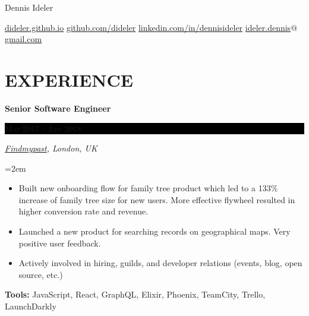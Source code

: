 \documentclass[paper=a4,fontsize=11pt]{scrartcl} %
\newlength{\spacebox}
\newcommand{\sepspace}{\vspace*{1em}}     %
\newcommand{\FullName}[1]{
    \Huge \usefont{OT1}{phv}{b}{n} \hfill #1
    \par \normalsize \normalfont}
\newcommand{\Slogan}[1]{
    \large \usefont{OT1}{phv}{m}{n}\hfill \textit{#1}
    \par \normalsize \normalfont}
\newcommand{\NewPart}[1]{\section*{\uppercase{#1}}}
\newcommand{\PersonalEntry}[2]{
    \noindent\hangindent=2em\hangafter=0  %
    \parbox{\spacebox}{                   %
    \textit{#1}}                          %
    \hspace{1.5em} #2 \par}               %
\newcommand{\EducationEntry}[4]{
    \noindent \textbf{#1} \hfill        %
    \colorbox{Black}{
      \parbox{8.5em}{
      \hfill\color{White}#2}} \par      %
    \noindent \textit{#3} \par          %
    \noindent\hangindent=2em\hangafter=0 \small #4 %
    \normalsize \par}
\newcommand{\WorkEntry}[4]{             %
    \noindent \textbf{#1} \hfill        %
    \colorbox{Black}{%
      \parbox{9em}{%
      \hfill\color{White}#2}} \par      %
        \noindent \textit{#3} \par      %
    \noindent\hangindent=2em\hangafter=0 \small #4 %
    \normalsize \par}
\begin{document}
\FullName{Dennis Ideler}
\bigskip
{\small
  \href{https://dideler.github.io}{dideler.github.io} \quad
  \href{https://github.com/dideler}{github.com/dideler} \quad
  \href{https://linkedin.com/in/dennisideler}{linkedin.com/in/dennisideler} \quad
  \href{mailto:ideler.dennis@gmail.com}{ideler.dennis$@$gmail.com}
}

\sepspace

%


\NewPart{Experience}{}


\WorkEntry{Senior Software Engineer}{Mar 2017 - Apr 2018}
{\href{https://www.findmypast.co.uk/}{Findmypast}, London, UK}
{
  \begin{itemize} \itemsep -1pt
    \item Built new onboarding flow for family tree product which led to a 133\% increase of family tree size for new users.
    More effective flywheel resulted in higher conversion rate and revenue.
    \item Launched a new product for searching records on geographical maps. Very positive user feedback.
    \item Actively involved in hiring, guilds, and developer relations (events, blog, open source, etc.)
  \end{itemize}
  \textbf{Tools:} JavaScript, React, GraphQL, Elixir, Phoenix, TeamCity, Trello, LaunchDarkly
}
\sepspace
\end{document}
